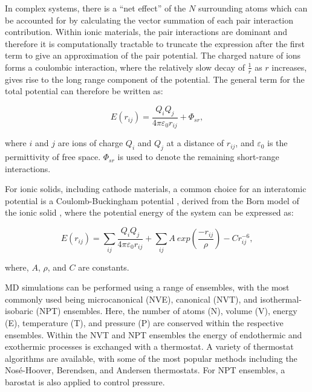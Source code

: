 \documentclass[../main.tex]{subfiles}
\begin{document}
In complex systems, there is a ``net effect'' of the $N$ surrounding atoms which can be accounted for by calculating the vector summation of each pair interaction contribution. Within ionic materials, the pair interactions are dominant and therefore it is computationally tractable to truncate the expression after the first term \cite{harding_computer_1990} to give an approximation of the pair potential. The charged nature of ions forms a coulombic interaction, where the relatively slow decay of $\frac{1}{r}$ as $r$ increases, gives rise to the long range component of the potential. The general term for the total potential can therefore be written as:

\begin{equation}
    E(r_{ij}) = \frac{Q_i Q_j}{4\pi \varepsilon_0 r_{ij}} + \Phi_{sr},
\end{equation}

where $i$ and $j$ are ions of charge $Q_i$ and $Q_j$ at a distance of $r_{ij}$, and $\varepsilon_0$ is the permittivity of free space. $\Phi_{sr}$ is used to denote the remaining short-range interactions.

For ionic solids, including cathode materials, a common choice for an interatomic potential is a Coulomb-Buckingham potential \cite{buckingham_classical_1938}, derived from the Born model of the ionic solid \cite{born_1932, mayer_1932}, where the potential energy of the system can be expressed as:

\begin{equation}
    E(r_{ij}) =  \sum_{ij} \frac{Q_i Q_j}{4\pi \varepsilon_0 r_{ij}} + \sum_{ij} A \ exp(\frac{-r_{ij}}{\rho}) - Cr_{ij}^{-6},
    \label{eqn:buckingham}
\end{equation}

where, $A$, $\rho$, and $C$ are constants.

MD simulations can be performed using a range of ensembles, with the most commonly used being microcanonical (NVE), canonical (NVT), and isothermal-isobaric (NPT) ensembles. \cite{todorov2006dl_poly_3, PLIMPTON19951, gale_gulp_1997} Here, the number of atoms (N), volume (V), energy (E), temperature (T), and pressure (P) are conserved within the respective ensembles. Within the NVT and NPT ensembles the energy of endothermic and exothermic processes is exchanged with a thermostat. A variety of thermostat algorithms are available, with some of the most popular methods including the Nos\'{e}-Hoover, Berendsen, and Andersen thermostats. \cite{todorov2006dl_poly_3, PLIMPTON19951, gale_gulp_1997} For NPT ensembles, a barostat is also applied to control pressure.
\end{document}
